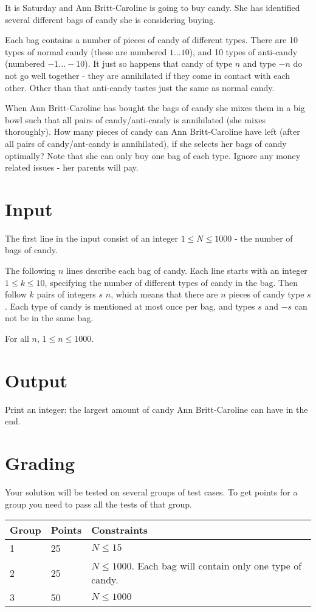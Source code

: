 It is Saturday and Ann Britt-Caroline is going to buy candy. She has identified several different bags of candy she is considering buying.

Each bag contains a number of pieces of candy of different types. There are 10 types of normal candy (these are numbered $1...10$), and 10 types of anti-candy (numbered $-1...-10$). It just so happens that candy of type $n$ and type $-n$ do not go well together - they are annihilated if they come in contact with each other. Other than that anti-candy tastes just the same as normal candy.

When Ann Britt-Caroline has bought the bags of candy she mixes them in a big bowl such that all pairs of candy/anti-candy is annihilated (she mixes thoroughly). How many pieces of candy can Ann Britt-Caroline have left (after all pairs of candy/ant-candy is annihilated), if she selects her bags of candy optimally? Note that she can only buy one bag of each type. Ignore any money related issues - her parents will pay.
\section*{Input}
The first line in the input consist of an integer $1 \le N \le 1000$ - the number of bags of candy.

The following $n$ lines describe each bag of candy.
Each line starts with an integer $1 \le k \le 10$, specifying the number of different types of candy in the bag.
Then follow $k$ pairs of integers $s$ $n$, which means that there are $n$ pieces of candy type $s$.
Each type of candy is mentioned at most once per bag, and types $s$ and $-s$ can not be in the same bag.

For all $n$, $1 \le n \le 1000$.

\section*{Output}
Print an integer: the largest amount of candy Ann Britt-Caroline can have in the end.

\section*{Grading}
Your solution will be tested on several groups of test cases. To get points for a group you need to pass all the tests of that group.

\noindent
\begin{tabular}{| l | l | l |}
	\hline
	Group & Points & Constraints\\ \hline
  1     & 25         & $N \le 15$ \\ \hline
  2     & 25         & $N \le 1000$. Each bag will contain only one type of candy. \\ \hline
  3     & 50         & $N \le 1000$ \\ \hline
\end{tabular}
